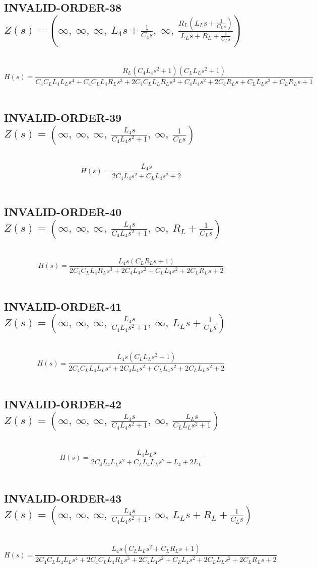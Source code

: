 \documentclass{article}
\begin{document}
\subsection{INVALID-ORDER-38 $Z(s) = \left( \infty, \  \infty, \  \infty, \  L_{4} s + \frac{1}{C_{4} s}, \  \infty, \  \frac{R_{L} \left(L_{L} s + \frac{1}{C_{L} s}\right)}{L_{L} s + R_{L} + \frac{1}{C_{L} s}}\right)$ } \ 
\textbf{\[H(s) = \frac{R_{L} \left(C_{4} L_{4} s^{2} + 1\right) \left(C_{L} L_{L} s^{2} + 1\right)}{C_{4} C_{L} L_{4} L_{L} s^{4} + C_{4} C_{L} L_{4} R_{L} s^{3} + 2 C_{4} C_{L} L_{L} R_{L} s^{3} + C_{4} L_{4} s^{2} + 2 C_{4} R_{L} s + C_{L} L_{L} s^{2} + C_{L} R_{L} s + 1}\] } \ 
\subsection{INVALID-ORDER-39 $Z(s) = \left( \infty, \  \infty, \  \infty, \  \frac{L_{4} s}{C_{4} L_{4} s^{2} + 1}, \  \infty, \  \frac{1}{C_{L} s}\right)$ } \ 
\textbf{\[H(s) = \frac{L_{4} s}{2 C_{4} L_{4} s^{2} + C_{L} L_{4} s^{2} + 2}\] } \ 
\subsection{INVALID-ORDER-40 $Z(s) = \left( \infty, \  \infty, \  \infty, \  \frac{L_{4} s}{C_{4} L_{4} s^{2} + 1}, \  \infty, \  R_{L} + \frac{1}{C_{L} s}\right)$ } \ 
\textbf{\[H(s) = \frac{L_{4} s \left(C_{L} R_{L} s + 1\right)}{2 C_{4} C_{L} L_{4} R_{L} s^{3} + 2 C_{4} L_{4} s^{2} + C_{L} L_{4} s^{2} + 2 C_{L} R_{L} s + 2}\] } \ 
\subsection{INVALID-ORDER-41 $Z(s) = \left( \infty, \  \infty, \  \infty, \  \frac{L_{4} s}{C_{4} L_{4} s^{2} + 1}, \  \infty, \  L_{L} s + \frac{1}{C_{L} s}\right)$ } \ 
\textbf{\[H(s) = \frac{L_{4} s \left(C_{L} L_{L} s^{2} + 1\right)}{2 C_{4} C_{L} L_{4} L_{L} s^{4} + 2 C_{4} L_{4} s^{2} + C_{L} L_{4} s^{2} + 2 C_{L} L_{L} s^{2} + 2}\] } \ 
\subsection{INVALID-ORDER-42 $Z(s) = \left( \infty, \  \infty, \  \infty, \  \frac{L_{4} s}{C_{4} L_{4} s^{2} + 1}, \  \infty, \  \frac{L_{L} s}{C_{L} L_{L} s^{2} + 1}\right)$ } \ 
\textbf{\[H(s) = \frac{L_{4} L_{L} s}{2 C_{4} L_{4} L_{L} s^{2} + C_{L} L_{4} L_{L} s^{2} + L_{4} + 2 L_{L}}\] } \ 
\subsection{INVALID-ORDER-43 $Z(s) = \left( \infty, \  \infty, \  \infty, \  \frac{L_{4} s}{C_{4} L_{4} s^{2} + 1}, \  \infty, \  L_{L} s + R_{L} + \frac{1}{C_{L} s}\right)$ } \ 
\textbf{\[H(s) = \frac{L_{4} s \left(C_{L} L_{L} s^{2} + C_{L} R_{L} s + 1\right)}{2 C_{4} C_{L} L_{4} L_{L} s^{4} + 2 C_{4} C_{L} L_{4} R_{L} s^{3} + 2 C_{4} L_{4} s^{2} + C_{L} L_{4} s^{2} + 2 C_{L} L_{L} s^{2} + 2 C_{L} R_{L} s + 2}\] } \ 
\end{document}
